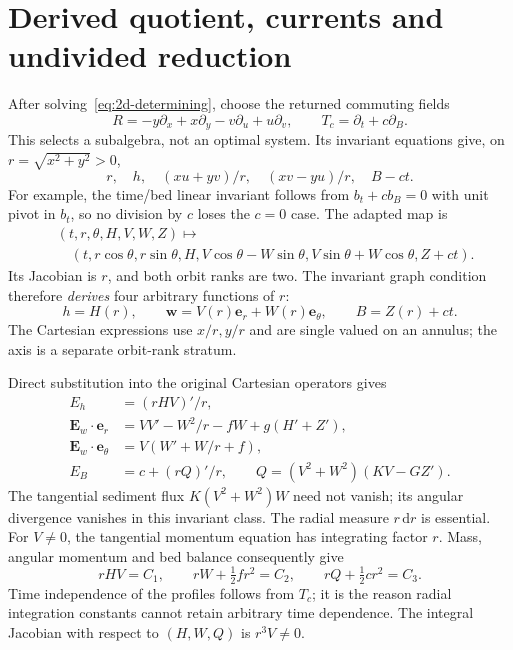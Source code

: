 \documentclass[12pt,a4paper,oneside]{report}
\numberwithin{equation}{chapter}
\theoremstyle{remark}\newtheorem{remark}[theorem]{Remark}
\newcommand{\dd}{\,\mathrm d}
\begin{document}
\section{Derived quotient, currents and undivided reduction}
After solving~\eqref{eq:2d-determining}, choose the returned commuting fields
\begin{equation}
 R=-y\partial_x+x\partial_y-v\partial_u+u\partial_v,\qquad
 T_c=\partial_t+c\partial_B.
\end{equation}
This selects a subalgebra, not an optimal system. Its invariant equations
give, on $r=\sqrt{x^2+y^2}>0$,
\begin{equation}\label{eq:2d-invariants}
 r,\quad h,\quad (xu+yv)/r,\quad(xv-yu)/r,\quad B-ct.
\end{equation}
For example, the time/bed linear invariant follows from $b_t+cb_B=0$ with
unit pivot in $b_t$, so no division by $c$ loses the $c=0$ case.
The adapted map is
\[
 \begin{aligned}
 &(t,r,\theta,H,V,W,Z)\mapsto\\
 &\quad(t,r\cos\theta,r\sin\theta,H,
       V\cos\theta-W\sin\theta,V\sin\theta+W\cos\theta,Z+ct).
 \end{aligned}
\]
Its Jacobian is $r$, and both orbit ranks are two. The invariant graph
condition therefore \emph{derives} four arbitrary functions of $r$:
\begin{equation}\label{eq:annular}
 h=H(r),\qquad \mathbf w=V(r)\mathbf e_r+W(r)\mathbf e_\theta,
 \qquad B=Z(r)+ct.
\end{equation}
The Cartesian expressions use $x/r,y/r$ and are single valued on an annulus;
the axis is a separate orbit-rank stratum.

Direct substitution into the original Cartesian operators gives
\begin{equation}\label{eq:radial}
\begin{aligned}
 E_h&=(rHV)'/r,\\
 \mathbf E_w\cdot\mathbf e_r&=VV'-W^2/r-fW+g(H'+Z'),\\
 \mathbf E_w\cdot\mathbf e_\theta&=V(W'+W/r+f),\\
 E_B&=c+(rQ)'/r,\qquad Q=(V^2+W^2)(KV-GZ').
\end{aligned}
\end{equation}
The tangential sediment flux $K(V^2+W^2)W$ need not vanish; its angular
divergence vanishes in this invariant class. The radial measure $r\dd r$
is essential. For $V\ne0$, the tangential momentum equation has integrating
factor $r$. Mass, angular momentum and bed balance consequently give
\begin{equation}\label{eq:radial-integrals}
 rHV=C_1,\qquad rW+\tfrac12fr^2=C_2,\qquad rQ+\tfrac12cr^2=C_3.
\end{equation}
Time independence of the profiles follows from $T_c$; it is the reason
radial integration constants cannot retain arbitrary time dependence.
The integral Jacobian with respect to $(H,W,Q)$ is $r^3V\ne0$.
\end{document}
